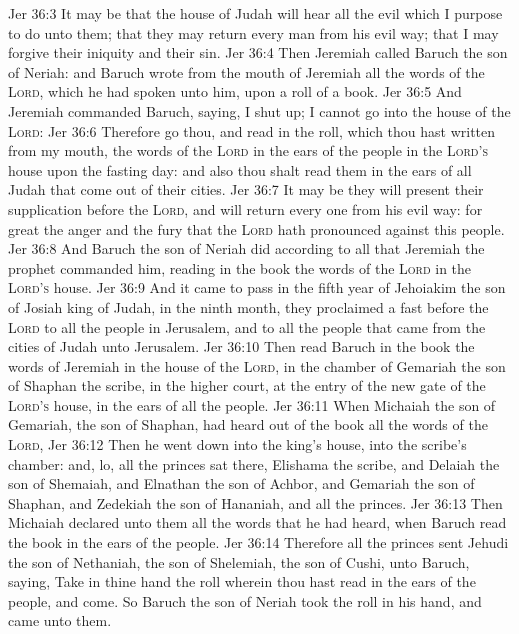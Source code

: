 \vs Jer 36:3 It may be that the house of Judah will hear all the evil which I purpose to do unto them; that they may return every man from his evil way; that I may forgive their iniquity and their sin.
\vs Jer 36:4 Then Jeremiah called Baruch the son of Neriah: and Baruch wrote from the mouth of Jeremiah all the words of the \textsc{Lord}, which he had spoken unto him, upon a roll of a book.
\vs Jer 36:5 And Jeremiah commanded Baruch, saying, I  shut up; I cannot go into the house of the \textsc{Lord}:
\vs Jer 36:6 Therefore go thou, and read in the roll, which thou hast written from my mouth, the words of the \textsc{Lord} in the ears of the people in the \textsc{Lord's} house upon the fasting day: and also thou shalt read them in the ears of all Judah that come out of their cities.
\vs Jer 36:7 It may be they will present their supplication before the \textsc{Lord}, and will return every one from his evil way: for great  the anger and the fury that the \textsc{Lord} hath pronounced against this people.
\vs Jer 36:8 And Baruch the son of Neriah did according to all that Jeremiah the prophet commanded him, reading in the book the words of the \textsc{Lord} in the \textsc{Lord's} house.
\vs Jer 36:9 And it came to pass in the fifth year of Jehoiakim the son of Josiah king of Judah, in the ninth month,  they proclaimed a fast before the \textsc{Lord} to all the people in Jerusalem, and to all the people that came from the cities of Judah unto Jerusalem.
\vs Jer 36:10 Then read Baruch in the book the words of Jeremiah in the house of the \textsc{Lord}, in the chamber of Gemariah the son of Shaphan the scribe, in the higher court, at the entry of the new gate of the \textsc{Lord's} house, in the ears of all the people.
\vs Jer 36:11 When Michaiah the son of Gemariah, the son of Shaphan, had heard out of the book all the words of the \textsc{Lord},
\vs Jer 36:12 Then he went down into the king's house, into the scribe's chamber: and, lo, all the princes sat there,  Elishama the scribe, and Delaiah the son of Shemaiah, and Elnathan the son of Achbor, and Gemariah the son of Shaphan, and Zedekiah the son of Hananiah, and all the princes.
\vs Jer 36:13 Then Michaiah declared unto them all the words that he had heard, when Baruch read the book in the ears of the people.
\vs Jer 36:14 Therefore all the princes sent Jehudi the son of Nethaniah, the son of Shelemiah, the son of Cushi, unto Baruch, saying, Take in thine hand the roll wherein thou hast read in the ears of the people, and come. So Baruch the son of Neriah took the roll in his hand, and came unto them.
